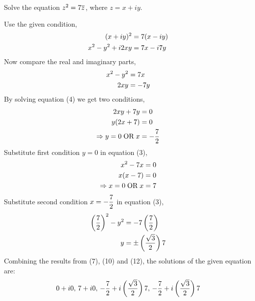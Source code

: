 

\question[3] Solve the equation $z^2=7 \overline{z}$, where $z=x+iy$.

\watchout

\begin{solution}[\fullpage]
  Use the given condition,
  \begin{align}
    (x+iy)^2     &= 7(x-iy) \\
    x^2-y^2+i2xy &= 7 x-i7 y
  \end{align}
  Now compare the real and imaginary parts,
  \begin{align}
    x^2-y^2 &= 7 x \\
    2xy     &= -7 y
  \end{align}
  By solving equation (4) we get two conditions,
  \begin{align}
    2xy+7 y &= 0 \\
    y(2x+7) &= 0 \\
    \Rightarrow y=0\;\text{OR}\; x &=-\dfrac{7}{2}
  \end{align}
  Substitute first condition $y=0$ in equation (3),
  \begin{align}
    x^2-7 x &= 0\\
    x(x-7)  &= 0\\
    \Rightarrow x=0\;\text{OR}\; x&=7
  \end{align}
  Substitute second condition $x=-\dfrac{7}{2}$ in equation (3),
  \begin{align}
    \left(\dfrac{7}{2}\right)^2-y^2 &=-7\left(\dfrac{7}{2}\right)\\
    y &=\pm\left(\dfrac{\sqrt{3}}{2}\right)7
  \end{align}
  Combining the results from (7), (10) and (12), the solutions of
  the given equation are:
  \begin{align}
    0+i0,\,7+i0,\,
    -\dfrac{7}{2}+i\left(\dfrac{\sqrt{3}}{2}\right)7,\,
    -\dfrac{7}{2}+i\left(\dfrac{\sqrt{3}}{2}\right)7
  \end{align}
\end{solution}


